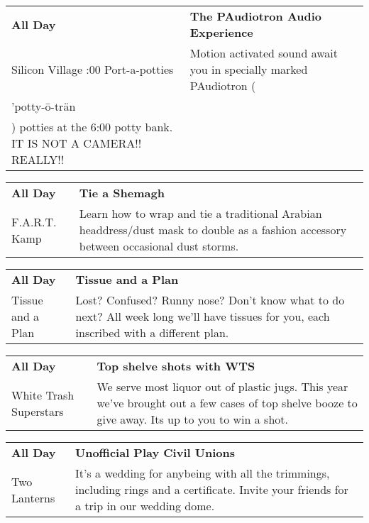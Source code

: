 \begin{tabular}{ p{1in} p{2.2in} }
    \textbf{All Day} & \textbf{The PAudiotron Audio Experience} \\
    Silicon Village \newline 6:00 Port-a-potties & Motion activated sound await you in specially marked PAudiotron (\\'potty-\=o-tr\"an\\) potties at the 6:00 potty bank.  IT IS NOT A CAMERA!!  REALLY!! \\
    \hline 
\end{tabular}
    
\begin{tabular}{ p{1in} p{2.2in} }
    \textbf{All Day} & \textbf{Tie a Shemagh} \\
    F.A.R.T. Kamp \newline  & Learn how to wrap and tie a traditional Arabian headdress/dust mask to double as a fashion accessory between occasional dust storms. \\
    \hline 
\end{tabular}
    
\begin{tabular}{ p{1in} p{2.2in} }
    \textbf{All Day} & \textbf{Tissue and a Plan} \\
    Tissue and a Plan \newline  & Lost? Confused? Runny nose? Don't know what to do next? All week long we'll have tissues for you, each inscribed with a different plan. \\
    \hline 
\end{tabular}
    
\begin{tabular}{ p{1in} p{2.2in} }
    \textbf{All Day} & \textbf{Top shelve shots with WTS} \\
    White Trash Superstars \newline  & We serve most liquor out of plastic jugs. This year we've brought out a few cases of top shelve booze to give away. Its up to you to win a shot. \\
    \hline 
\end{tabular}
    
\begin{tabular}{ p{1in} p{2.2in} }
    \textbf{All Day} & \textbf{Unofficial Play Civil Unions} \\
    Two Lanterns \newline  & It's a wedding for anybeing with all the trimmings, including rings and a certificate.  Invite your friends for a trip in our wedding dome. \\
    \hline 
\end{tabular}
    
